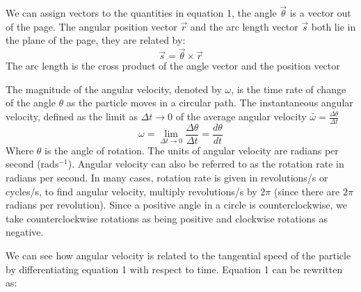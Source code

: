 \documentclass[a4paper]{article}
\begin{document}
\noindent We can assign vectors to the quantities in equation 1, the angle $\vec{\theta}$ is a vector out of the page. The angular position vector $\vec{r}$ and the arc length vector $\vec{s}$ both lie in the plane of the page, they are related by:
\begin{equation}
    \vec{s} = \vec{\theta} \times \vec{r}
\end{equation}
The arc length is the cross product of the angle vector and the position vector
\begin{center}
\end{center}
The magnitude of the angular velocity, denoted by $\omega$, is the time rate of change of the angle $\theta$ as the particle moves in a circular path. The instantaneous angular velocity, defined as the limit as $\Delta t \to 0$ of the average angular velocity $\bar{\omega} = \frac{\Delta\theta}{\Delta t}$
\begin{equation}
    \omega = \lim\limits_{\Delta t \to 0}\frac{\Delta\theta}{\Delta t} = \frac{d\theta}{dt}
\end{equation}
Where $\theta$ is the angle of rotation. The units of angular velocity are radians per second (rad\;s$^{-1}$). Angular velocity can also be referred to as the rotation rate in radians per second. In many cases, rotation rate is given in revolutions/s or cycles/s, to find angular velocity, multiply revolutions/s by $2\pi$ (since there are $2\pi$ radians per revolution). Since a positive angle in a circle is counterclockwise, we take counterclockwise rotations as being positive and clockwise rotations as negative.\vspace{1mm}\par
\noindent We can see how angular velocity is related to the tangential speed of the particle by differentiating equation 1 with respect to time. Equation 1 can be rewritten as:
\end{document}
